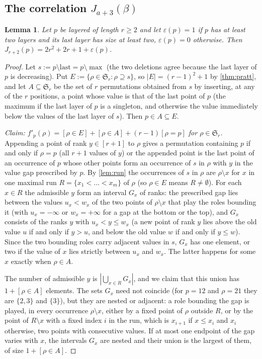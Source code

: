 \documentclass[11pt,reqno]{amsart}
\theoremstyle{plain}
\newtheorem{lemma}[lemma]{Lemma}
\theoremstyle{definition}
\theoremstyle{remark}
\newcommand{\bb}[1]{\left[#1\right]}
\newcommand{\Sym}{\mathfrak{S}}
\begin{document}
\subsection{The correlation \texorpdfstring{$J_{a+3}(\beta)$}{J(a+3)}}

\begin{lemma}\label{lem:C}
Let $p$ be layered of length $r\ge2$ and let $\varepsilon(p)=1$ if $p$ has at least two layers and its last layer has size at least two, $\varepsilon(p)=0$ otherwise. Then $J_{r+2}(p)=2r^2+2r+1+\varepsilon(p)$.
\end{lemma}

\begin{proof}
Let $s:=p\setminus\!\mathrm{last}=p\setminus\!\max$ (the two deletions agree because the last layer of $p$ is decreasing). Put $E:=\{\rho\in\Sym_r:\rho\supseteq s\}$, so $|E|=(r-1)^2+1$ by \cref{thm:pratt}, and let $A\subseteq\Sym_r$ be the set of $r$ permutations obtained from $s$ by inserting, at any of the $r$ positions, a point whose value is that of the last point of $p$ (the maximum if the last layer of $p$ is a singleton, and otherwise the value immediately below the values of the last layer of $s$). Then $p\in A\subseteq E$.

\emph{Claim: $f'_p(\rho)=\bb{\rho\in E}+\bb{\rho\in A}+(r-1)\bb{\rho=p}$ for $\rho\in\Sym_r$.} Appending a point of rank $y\in[r+1]$ to $\rho$ gives a permutation containing $p$ if and only if $\rho=p$ (all $r+1$ values of $y$) or the appended point is the last point of an occurrence of $p$ whose other points form an occurrence of $s$ in $\rho$ with $y$ in the value gap prescribed by $p$. By \cref{lem:run} the occurrences of $s$ in $\rho$ are $\rho\setminus x$ for $x$ in one maximal run $R=\{x_1<\dots<x_m\}$ of $\rho$ (so $\rho\in E$ means $R\ne\emptyset$). For each $x\in R$ the admissible $y$ form an interval $G_x$ of ranks: the prescribed gap lies between the values $u_x<w_x$ of the two points of $\rho\setminus x$ that play the roles bounding it (with $u_x=-\infty$ or $w_x=+\infty$ for a gap at the bottom or the top), and $G_x$ consists of the ranks $y$ with $u_x<y\le w_x$ (a new point of rank $y$ lies above the old value $u$ if and only if $y>u$, and below the old value $w$ if and only if $y\le w$). Since the two bounding roles carry adjacent values in $s$, $G_x$ has one element, or two if the value of $x$ lies strictly between $u_x$ and $w_x$. The latter happens for some $x$ exactly when $\rho\in A$. 

The number of admissible $y$ is $|\bigcup_{x\in R}G_x|$, and we claim that this union has $1+\bb{\rho\in A}$ elements. The sets $G_x$ need not coincide (for $p=12$ and $\rho=21$ they are $\{2,3\}$ and $\{3\}$), but they are nested or adjacent: a role bounding the gap is played, in every occurrence $\rho\setminus x$, either by a fixed point of $\rho$ outside $R$, or by the point of $R\setminus x$ with a fixed index $i$ in the run, which is $x_{i+1}$ if $x\le x_i$ and $x_i$ otherwise, two points with consecutive values. If at most one endpoint of the gap varies with $x$, the intervals $G_x$ are nested and their union is the largest of them, of size $1+\bb{\rho\in A}$. 


\end{proof}
\end{document}

